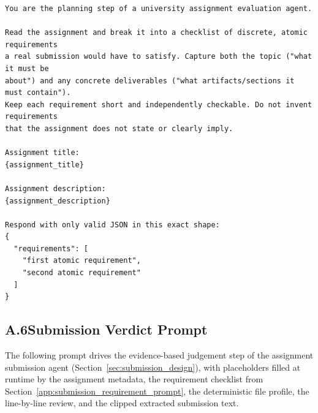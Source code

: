 \documentclass[a4paper,12pt]{article}
\begin{document}
\begin{lstlisting}[style=promptstyle]
You are the planning step of a university assignment evaluation agent.

Read the assignment and break it into a checklist of discrete, atomic requirements
a real submission would have to satisfy. Capture both the topic ("what it must be
about") and any concrete deliverables ("what artifacts/sections it must contain").
Keep each requirement short and independently checkable. Do not invent requirements
that the assignment does not state or clearly imply.

Assignment title:
{assignment_title}

Assignment description:
{assignment_description}

Respond with only valid JSON in this exact shape:
{
  "requirements": [
    "first atomic requirement",
    "second atomic requirement"
  ]
}
\end{lstlisting}

\subsection*{A.6\quad Submission Verdict Prompt}
\label{app:submission_verdict_prompt}
The following prompt drives the evidence-based judgement step of the assignment submission agent (Section~\ref{sec:submission_design}), with placeholders filled at runtime by the assignment metadata, the requirement checklist from Section~\ref{app:submission_requirement_prompt}, the deterministic file profile, the line-by-line review, and the clipped extracted submission text.
\end{document}

